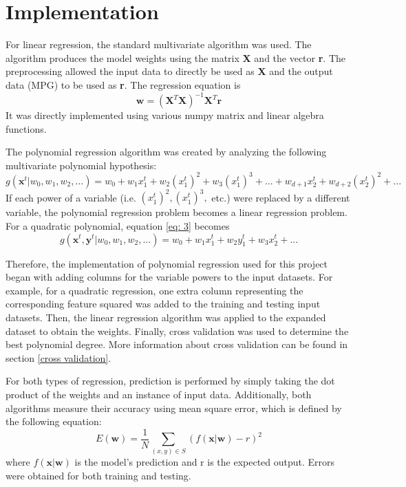 \documentclass[12pt]{article}
\begin{document}
    \section{Implementation}
    
    For linear regression, the standard multivariate algorithm was used. The algorithm produces the model weights using the matrix \textbf{X} and the vector \textbf{r}. The preprocessing allowed the input data to directly be used as \textbf{X} and the output data (MPG) to be used as \textbf{r}. The regression equation is
    \begin{equation} \label{eq: 2}
    	\mathbf{w} = (\mathbf{X}^{T}\mathbf{X})^{-1}\mathbf{X}^{T}\mathbf{r}
    \end{equation}
    It was directly implemented using various numpy matrix and linear algebra functions.
    
    The polynomial regression algorithm was created by analyzing the following multivariate polynomial hypothesis:
    \begin{equation} \label{eq: 3}
        g(\mathbf{x}^{t}|w_0, w_1, w_2, ...) = w_0 + w_{1}x_{1}^{t} + w_{2}(x_{1}^{t})^{2} + w_{3}(x_{1}^{t})^{3} + ... + w_{d+1}x_{2}^{t} + w_{d+2}(x_{2}^{t})^{2} + ...
    \end{equation}
    If each power of a variable (i.e. $(x_{1}^{t})^2, (x_{1}^{t})^3,$ etc.) were replaced by a different variable, the polynomial regression problem becomes a linear regression problem. For a quadratic polynomial, equation \ref{eq: 3} becomes
    \begin{equation} \label{eq: 4}
    	g(\mathbf{x}^t, \mathbf{y}^t|w_0, w_1, w_2, ...) = w_0 + w_{1}x_{1}^{t} + w_{2}y_{1}^{t} + w_{3}x_{2}^{t} + ...
    \end{equation}
    
    Therefore, the implementation of polynomial regression used for this project began with adding columns for the variable powers to the input datasets. For example, for a quadratic regression, one extra column representing the corresponding feature squared was added to the training and testing input datasets. Then, the linear regression algorithm was applied to the expanded dataset to obtain the weights. Finally, cross validation was used to determine the best polynomial degree. More information about cross validation can be found in section \ref{cross validation}.
    
    For both types of regression, prediction is performed by simply taking the dot product of the weights and an instance of input data. Additionally, both algorithms measure their accuracy using mean square error, which is defined by the following equation:
    \begin{equation}
    	E(\mathbf{w}) = \frac{1}{N} \sum_{(x,y)\in S} (f(\mathbf{x}|\mathbf{w}) - r)^2
    \end{equation}
    where $f(\mathbf{x}|\mathbf{w})$ is the model's prediction and r is the expected output. Errors were obtained for both training and testing.
    
\end{document}
